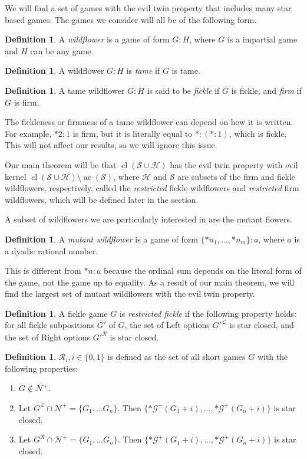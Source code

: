 \documentclass{amsart}
\theoremstyle{plain}
\theoremstyle{definition}
\newtheorem{defn}[thm]{Definition}
\theoremstyle{remark}
\numberwithin{equation}{section}
\numberwithin{thm}{section}
\DeclareMathOperator{\cl}{cl}
\DeclareMathOperator{\ac}{ac}
\begin{document}
We will find a set of games with the evil twin property that includes many star based games. The games we consider will all be of the following form. 
\begin{defn}
    A \emph{wildflower} is a game of form $G:H$, where $G$ is a impartial game and $H$ can be any game. 
\end{defn}
\begin{defn}
    A wildflower $G:H$ is \emph{tame} if $G$ is tame.
\end{defn}
\begin{defn}
    A tame wildflower $G:H$ is said to be \emph{fickle} if $G$ is fickle, and \emph{firm} if $G$ is firm.
\end{defn}

The fickleness or firmness of a tame wildflower can depend on how it is written. For example, $*2:1$ is firm, but it is literally equal to $*:(*:1)$, which is fickle. This will not affect our results, so we will ignore this issue.

Our main theorem will be that $\cl(\mathscr{S} \cup \mathscr{H})$ has the evil twin property with evil kernel $\cl(\mathscr{S}\cup \mathscr{H}) \setminus \ac(\mathscr{S})$, where $\mathscr{H}$ and $\mathscr{S}$ are subsets of the firm and fickle wildflowers, respectively, called the \emph{restricted} fickle wildflowers and \emph{restricted} firm wildflowers, which will be defined later in the section.

A subset of wildflowers we are particularly interested in are the mutant flowers. \begin{defn}
    A \emph{mutant wildflower} is a game of form $\{*n_1,\dots,*n_m\}:a$, where $a$ is a dyadic rational number.
\end{defn}
This is different from $*n:a$ because the ordinal sum depends on the literal form of the game, not the game up to equality. As a result of our main theorem, we will find the largest set of mutant wildflowers with the evil twin property.

\begin{defn}
    A fickle game $G$ is \emph{restricted fickle} if the following property holds: for all fickle subpositions $G'$ of $G$, the set of Left options $G'^{\mathcal{L}}$ is star closed, and the set of Right options $G'^{\mathcal{R}}$ is star closed.
\end{defn}

\begin{defn}
    $\mathscr{R}_i, i \in \{0,1\}$  is defined as the set of all short games $G$ with the following properties:

    \begin{enumerate}
        \item $G \not \in \mathcal{N}^+$.
        \item Let $G^{\mathcal{L}} \cap \mathcal{N}^+ =\{ G_1 ,\dots G_n \}$. Then $\{ *\mathcal{G}^+(G_1+i), \dots,* \mathcal{G}^+(G_n + i) \}$ is star closed. 
        \item Let $G^{\mathcal{R}} \cap \mathcal{N}^+ =\{ G_1 ,\dots G_n \}$. Then $\{ *\mathcal{G}^+(G_1+i), \dots,*\mathcal{G}^+(G_n + i) \}$ is star closed. 
    \end{enumerate}
    \end{defn}
    
\end{document}
